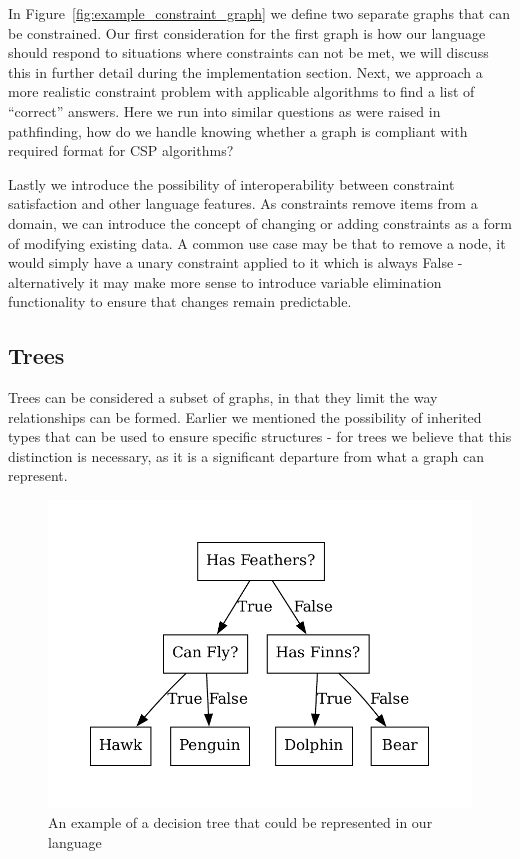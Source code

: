 In Figure~\ref{fig:example_constraint_graph} we define two separate graphs that can be constrained.
Our first consideration for the first graph is how our language should respond to situations where constraints can not
be met, we will discuss this in further detail during the implementation section.
Next, we approach a more realistic constraint problem with applicable algorithms to find a list of ``correct'' answers.
Here we run into similar questions as were raised in pathfinding, how do we handle knowing whether a graph is compliant
with required format for CSP algorithms?

Lastly we introduce the possibility of interoperability between constraint satisfaction and other language features.
As constraints remove items from a domain, we can introduce the concept of changing or adding constraints as a form
of modifying existing data.
A common use case may be that to remove a node, it would simply have a unary constraint applied to it which is always
False - alternatively it may make more sense to introduce variable elimination functionality to ensure that changes
remain predictable.

\subsection{Trees}\label{subsec:trees}
Trees can be considered a subset of graphs, in that they limit the way relationships can be formed.
Earlier we mentioned the possibility of inherited types that can be used to ensure specific structures - for trees we
believe that this distinction is necessary, as it is a significant departure from what a graph can represent.

\begin{figure}[H]
    \centering
    \includegraphics[width=12cm]{figures/example_graphs/decision_tree.gv}
    \caption{An example of a decision tree that could be represented in our language}
    \label{fig:example_decision_tree}
\end{figure}

